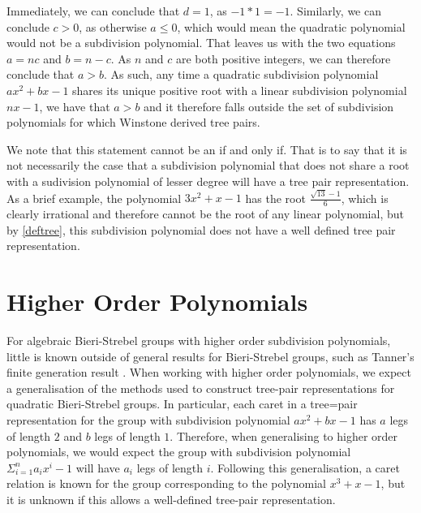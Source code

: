 \documentclass[
11pt, %
english, %
singlespacing, %
parskip, %
headsepline, %
]{amsart} %
\theoremstyle{definition}
\begin{document}
Immediately, we can conclude that $d=1$, as $-1*1=-1$. Similarly, we can conclude $c>0$, as otherwise $a \leq 0$, which would mean the quadratic polynomial would not be a subdivision polynomial. That leaves us with the two equations $a=nc$ and $b=n-c$. As $n$ and $c$ are both positive integers, we can therefore conclude that $a>b$. As such, any time a quadratic subdivision polynomial $ax^2+bx-1$ shares its unique positive root with a linear subdivision polynomial $nx-1$, we have that $a>b$ and it therefore falls outside the set of subdivision polynomials for which Winstone derived tree pairs.

We note that this statement cannot be an if and only if. That is to say that it is not necessarily the case that a subdivision polynomial that does not share a root with a sudivision polynomial of lesser degree will have a tree pair representation. As a brief example, the polynomial $3x^2+x-1$ has the root $\frac{\sqrt{13}-1}{6}$, which is clearly irrational and therefore cannot be the root of any linear polynomial, but by \ref{deftree}, this subdivision polynomial does not have a well defined tree pair representation. 

\section{Higher Order Polynomials}

For algebraic Bieri-Strebel groups with higher order subdivision polynomials, little is known outside of general results for Bieri-Strebel groups, such as Tanner's finite generation result \cite{Tanner}. When working with higher order polynomials, we expect a generalisation of the methods used to construct tree-pair representations for quadratic Bieri-Strebel groups. In particular, each caret in a tree=pair representation for the group with subdivision polynomial $ax^2+bx-1$ has $a$ legs of length $2$ and $b$ legs of length $1$. Therefore, when generalising to higher order polynomials, we would expect the group with subdivision polynomial $\Sigma_{i=1}^n a_i x^i -1$ will have $a_i$ legs of length $i$. Following this generalisation, a caret relation is known for the group corresponding to the polynomial $x^3+x-1$, but it is unknown if this allows a well-defined tree-pair representation.
\end{document}
